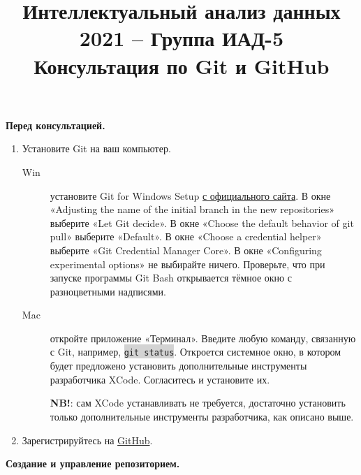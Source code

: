 \documentclass[10pt, a4paper]{extarticle}
\title{{\normalsize Интеллектуальный анализ данных 2021 – Группа ИАД-5} \\ \vspace{0.5em} Консультация по Git и GitHub}
\author{\rule{15cm}{0.4pt}}
\newcommand{\code}[1]{\colorbox{lightgray}{{\tt #1}}}
\begin{document}
	
	\maketitle

	{\Large \textbf{Перед консультацией.}}
	
	\begin{enumerate}
		\item Установите Git на ваш компьютер.
		\begin{description}
			
			\item[Win] установите Git for Windows Setup \href{http://git-scm.com/download/win}{с официального сайта}. В окне «Adjusting the name of the initial branch in the new repositories» выберите «Let Git decide». В окне «Choose the default behavior of git pull» выберите «Default». В окне «Choose a credential helper» выберите «Git Credential Manager Core». В окне «Configuring experimental options» не выбирайте ничего. Проверьте, что при запуске программы Git Bash открывается тёмное окно с разноцветными надписями. 
			
			\item[Mac] откройте приложение «Терминал». Введите любую команду, связанную с Git, например, \code{git status}. Откроется системное окно, в котором будет предложено установить дополнительные инструменты разработчика XCode. Согласитесь и установите их. 
			
			\textbf{NB!}: сам XCode устанавливать не требуется, достаточно установить только дополнительные инструменты разработчика, как описано выше. 
		\end{description}
	
		\item Зарегистрируйтесь на \href{https://github.com}{GitHub}.
	\end{enumerate}
	
	\vspace{1em}
	
	{\Large \textbf{Создание и управление репозиторием.}}
	
\end{document}
